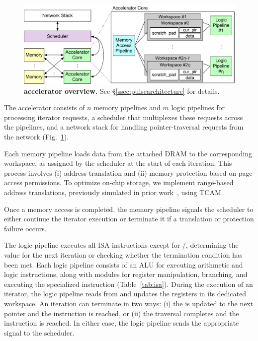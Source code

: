 \begin{figure}[t]
\centering
  \includegraphics[width=0.7\columnwidth]{fig/pulse/accelerator.pdf}
 \caption[\pulse accelerator overview]{\textbf{\pulse accelerator overview.} See \S\ref{ssec:pulsearchitecture} for details.}
\label{fig:accelnew}
\end{figure}
 The \pulse accelerator consists of $n$ memory pipelines and $m$ logic pipelines for processing iterator requests, a scheduler that multiplexes these requests across the pipelines, and a network stack for handling pointer-traversal requests from the network (Fig.~\ref{fig:accelnew}).

 Each memory pipeline loads data from the attached DRAM to the corresponding workspace, as assigned by the scheduler at the start of each iteration. This process involves (i) address translation and (ii) memory protection based on page access permissions. To optimize on-chip storage, we implement range-based address translations, previously simulated in prior work~\cite{range}, using TCAM.

Once a memory access is completed, the memory pipeline signals the scheduler to either continue the iterator execution or terminate it if a translation or protection failure occurs.

 The logic pipeline executes all \pulse ISA instructions except for /, determining the  value for the next iteration or checking whether the termination condition has been met. Each logic pipeline consists of an ALU for executing arithmetic and logic instructions, along with modules for register manipulation, branching, and executing the specialized  instruction (Table~\ref{tab:isa}). During the execution of an iterator, the logic pipeline reads from and updates the registers in its dedicated workspace. An iteration can terminate in two ways: (i) the  is updated to the next pointer and the  instruction is reached, or (ii) the traversal completes and the  instruction is reached. In either case, the logic pipeline sends the appropriate signal to the scheduler.


